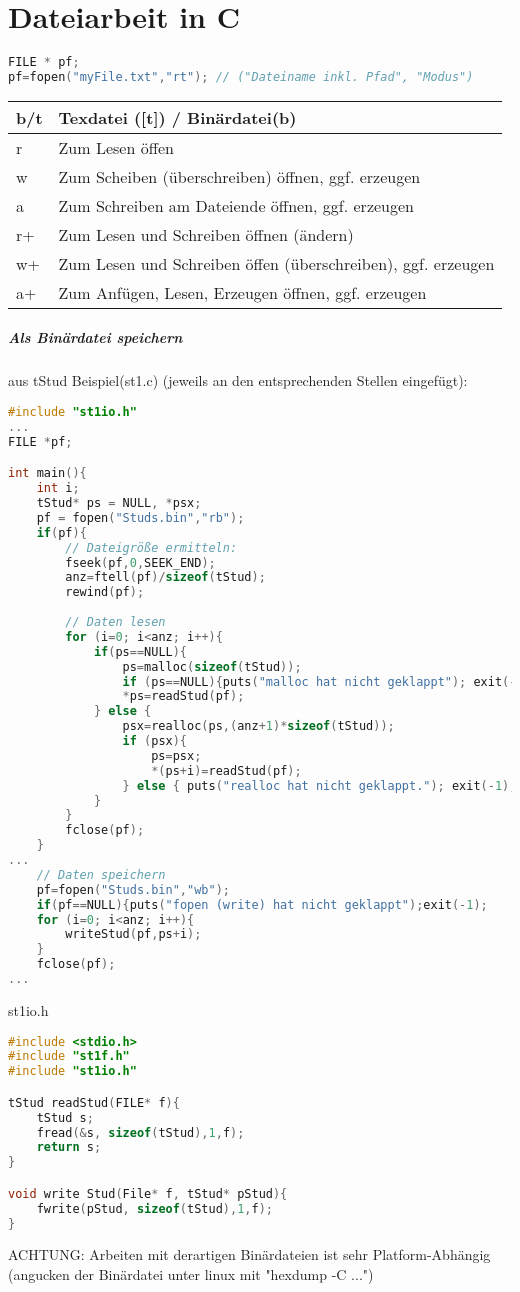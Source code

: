 \chapter{Dateiarbeit in C}
\begin{lstlisting}[language=C]
FILE * pf;
pf=fopen("myFile.txt","rt"); // ("Dateiname inkl. Pfad", "Modus")
\end{lstlisting}
\begin{tabular}{l | l}
b/t& Texdatei ([t]) / Binärdatei(b)\\
\hline 
r&Zum Lesen öffen\\
w&Zum Scheiben (überschreiben) öffnen, ggf. erzeugen\\
a&Zum Schreiben am Dateiende öffnen, ggf. erzeugen\\
r+&Zum Lesen und Schreiben öffnen (ändern)\\
w+&Zum Lesen und Schreiben öffen (überschreiben), ggf. erzeugen\\
a+&Zum Anfügen, Lesen, Erzeugen öffnen, ggf. erzeugen\\
\end{tabular}
\paragraph{Als Binärdatei speichern}
aus tStud Beispiel(st1.c) (jeweils an den entsprechenden Stellen eingefügt):
\begin{lstlisting}[language=C]
#include "st1io.h"
...
FILE *pf;

int main(){
	int i;
	tStud* ps = NULL, *psx;
	pf = fopen("Studs.bin","rb");
	if(pf){
		// Dateigröße ermitteln:
		fseek(pf,0,SEEK_END);
		anz=ftell(pf)/sizeof(tStud);
		rewind(pf);
		
		// Daten lesen
		for (i=0; i<anz; i++){
			if(ps==NULL){
				ps=malloc(sizeof(tStud));
				if (ps==NULL){puts("malloc hat nicht geklappt"); exit(-1);}
				*ps=readStud(pf);
			} else {	
				psx=realloc(ps,(anz+1)*sizeof(tStud));
				if (psx){
					ps=psx;
					*(ps+i)=readStud(pf);
				} else { puts("realloc hat nicht geklappt."); exit(-1);}
			}
		}
		fclose(pf);
	}
...
	// Daten speichern
	pf=fopen("Studs.bin","wb");
	if(pf==NULL){puts("fopen (write) hat nicht geklappt");exit(-1);
	for (i=0; i<anz; i++){
		writeStud(pf,ps+i);
	}
	fclose(pf);
...
\end{lstlisting}

st1io.h
\begin{lstlisting}[language=C]
#include <stdio.h>
#include "st1f.h"
#include "st1io.h"

tStud readStud(FILE* f){
	tStud s;
	fread(&s, sizeof(tStud),1,f);
	return s;
}

void write Stud(File* f, tStud* pStud){
	fwrite(pStud, sizeof(tStud),1,f);
}
\end{lstlisting}
ACHTUNG: Arbeiten mit derartigen Binärdateien ist sehr Platform-Abhängig (angucken der Binärdatei unter linux mit "hexdump -C ...")


